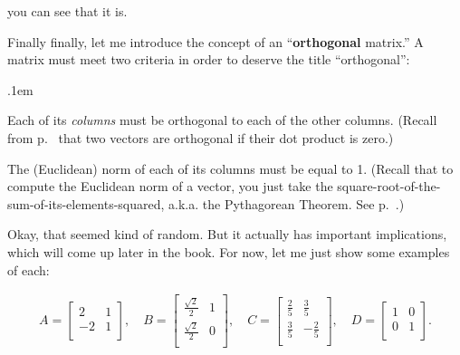 you can see that it is.

\bigskip


Finally finally, let me introduce the concept of an ``\textbf{orthogonal}
matrix.'' A matrix must meet two criteria in order to deserve the title
``orthogonal'':

\label{orthogonalMatrices}

\begin{compactenum}
\itemsep.1em

\item Each of its \textit{columns} must be orthogonal to each of the other
columns. (Recall from p.~\pageref{orthogonalMeansZeroDotProduct} that two
vectors are orthogonal if their dot product is zero.)

\item The (Euclidean) norm of each of its columns must be equal to 1. (Recall
that to compute the Euclidean norm of a vector, you just take the
square-root-of-the-sum-of-its-elements-squared, a.k.a. the Pythagorean Theorem.
See p.~\pageref{Euclideannorm}.)

\end{compactenum}

Okay, that seemed kind of random. But it actually has important implications,
which will come up later in the book. For now, let me just show some examples
of each:

\vspace{-.15in}
\begingroup
\renewcommand*{\arraystretch}{1.5}
\begin{align*}
A =
\begin{bmatrix}
2 & 1 \\
-2 & 1 \\
\end{bmatrix},\quad
B =
\begin{bmatrix}
\frac{\sqrt{2}}{2} & 1 \\
\frac{\sqrt{2}}{2} & 0 \\
\end{bmatrix},\quad
C =
\begin{bmatrix}
\frac{2}{5} & \frac{3}{5} \\
\frac{3}{5} & -\frac{2}{5} \\
\end{bmatrix},\quad
D =
\begin{bmatrix}
1 & 0 \\
0 & 1 \\
\end{bmatrix}.
\end{align*}
\endgroup

